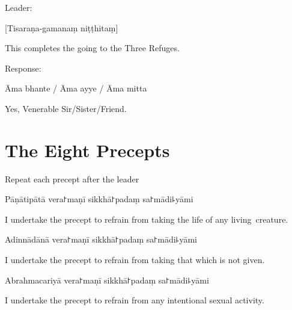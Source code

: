 \begin{instruction}
  Leader:
\end{instruction}

[Tisaraṇa-gamanaṃ niṭṭhitaṃ]

\begin{english}
  This completes the going to the Three Refuges.
\end{english}

\begin{instruction}
  Response:
\end{instruction}

Āma bhante / Āma ayye / Āma mitta

\begin{english}
  Yes, Venerable Sir/Sister/Friend.
\end{english}

\chapter{The Eight Precepts}%

\begin{instruction}
  Repeat each precept after the leader
\end{instruction}

\begin{precept}
  \setcounter{enumi}{0}
  \item Pāṇātipātā vera꜓maṇī sikkhā꜓padaṃ sa꜓mādi꜕yāmi
\end{precept}

\begin{english}
  I undertake the precept to refrain from taking the life of any living~creature.
\end{english}

\begin{precept}
  \setcounter{enumi}{1}
  \item Adinnādānā vera꜓maṇī sikkhā꜓padaṃ sa꜓mādi꜕yāmi
\end{precept}

\begin{english}
  I undertake the precept to refrain from taking that which is not given.
\end{english}

\begin{precept}
  \setcounter{enumi}{2}
  \item Abrahmacariyā vera꜓maṇī sikkhā꜓padaṃ sa꜓mādi꜕yāmi
\end{precept}

\begin{english}
  I undertake the precept to refrain from any intentional sexual activity.
\end{english}

